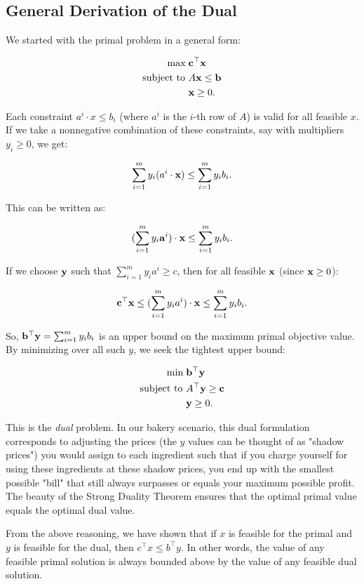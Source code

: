 \subsection*{General Derivation of the Dual}

We started with the primal problem in a general form:

\[
\begin{aligned}
\max \; & \mathbf{c}^\top \mathbf{x} \\
\mbox{subject to } & A\mathbf{x} \leq \mathbf{b} \\
& \mathbf{x} \geq 0.
\end{aligned}
\]

Each constraint $a^i \cdot x \leq b_i$ (where $a^i$ is the $i$-th row of $A$) is valid for all feasible $x$. If we take a nonnegative combination of these constraints, say with multipliers $y_i \geq 0$, we get:

\[
\sum_{i=1}^m y_i (a^i \cdot \mathbf{x}) \leq \sum_{i=1}^m y_i b_i.
\]

This can be written as:

\[
(\sum_{i=1}^m y_i \mathbf{a}^i) \cdot \mathbf{x} \leq \sum_{i=1}^m y_i b_i.
\]

If we choose $\mathbf{y}$ such that $\sum_{i=1}^m y_i a^i \geq c$, then for all feasible $\mathbf{x}$ (since $\mathbf{x} \geq 0$):

\[
\mathbf{c}^\top \mathbf{x} \leq (\sum_{i=1}^m y_i a^i)\cdot \mathbf{x} \leq \sum_{i=1}^m y_i b_i.
\]

So, $\mathbf{b}^\top \mathbf{y} = \sum_{i=1}^m y_i b_i$ is an upper bound on the maximum primal objective value. By minimizing over all such $y$, we seek the tightest upper bound:

\[
\begin{aligned}
\min \; & \mathbf{b}^\top \mathbf{y} \\
\mbox{subject to } & A^\top \mathbf{y} \geq \mathbf{c} \\
& \mathbf{y} \geq 0.
\end{aligned}
\]

This is the \emph{dual} problem. In our bakery scenario, this dual formulation corresponds to adjusting the prices (the $y$ values can be thought of as "shadow prices") you would assign to each ingredient such that if you charge yourself for using these ingredients at these shadow prices, you end up with the smallest possible "bill" that still always surpasses or equals your maximum possible profit. The beauty of the Strong Duality Theorem ensures that the optimal primal value equals the optimal dual value.


From the above reasoning, we have shown that if $x$ is feasible for the primal and $y$ is feasible for the dual, then $c^\top x \leq b^\top y$. In other words, the value of any feasible primal solution is always bounded above by the value of any feasible dual solution.

